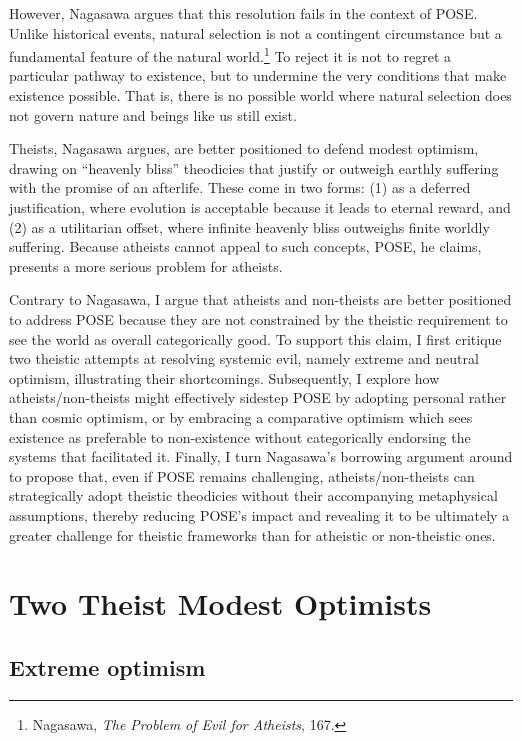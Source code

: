 However, Nagasawa argues that this resolution fails in the context of
POSE. Unlike historical events, natural selection is not a contingent
circumstance but a fundamental feature of the natural world.\footnote{Nagasawa,
  \emph{The Problem of Evil for Atheists}, 167.} To reject it is not to
regret a particular pathway to existence, but to undermine the very
conditions that make existence possible. That is, there is no possible
world where natural selection does not govern nature and beings like us
still exist.

Theists, Nagasawa argues, are better positioned to defend modest
optimism, drawing on ``heavenly bliss'' theodicies that justify or
outweigh earthly suffering with the promise of an afterlife. These come
in two forms: (1) as a deferred justification, where evolution is
acceptable because it leads to eternal reward, and (2) as a utilitarian
offset, where infinite heavenly bliss outweighs finite worldly
suffering. Because atheists cannot appeal to such concepts, POSE, he
claims, presents a more serious problem for atheists.

Contrary to Nagasawa, I argue that atheists and non-theists are better
positioned to address POSE because they are not constrained by the
theistic requirement to see the world as overall categorically good. To
support this claim, I first critique two theistic attempts at resolving
systemic evil, namely extreme and neutral optimism, illustrating their
shortcomings. Subsequently, I explore how atheists/non-theists might
effectively sidestep POSE by adopting personal rather than cosmic
optimism, or by embracing a comparative optimism which sees existence as
preferable to non-existence without categorically endorsing the systems
that facilitated it. Finally, I turn Nagasawa's borrowing argument
around to propose that, even if POSE remains challenging,
atheists/non-theists can strategically adopt theistic theodicies without
their accompanying metaphysical assumptions, thereby reducing POSE's
impact and revealing it to be ultimately a greater challenge for
theistic frameworks than for atheistic or non-theistic ones.

\section{Two Theist Modest Optimists}
\subsection{Extreme optimism}

